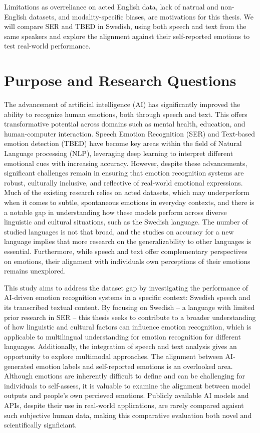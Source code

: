 Limitations as overreliance on acted English data, lack of natrual and non-English datasets, and modality-specific biases, are motivations for this thesis. We will compare SER and TBED in Swedish, using both speech and text from the same speakers and explore the alignment against their self-reported emotions to test real-world performance. 

\newpage
\section{Purpose and Research Questions}

The advancement of artificial intelligence (AI) has significantly improved the ability to recognize human emotions, both through speech and text. This offers transformative potential across domains such as mental health, education, and human-computer interaction. Speech Emotion Recognition (SER) and Text-based emotion detection (TBED) have become key areas within the field of Natural Language processing (NLP), leveraging deep learning to interpret different emotional cues with increasing accuracy. However, despite these advancements, significant challenges remain in ensuring that emotion recognition systems are robust, culturally inclusive, and reflective of real-world emotional expressions. Much of the existing research relies on acted datasets, which may underperform when it comes to subtle, spontaneous emotions in everyday contexts, and there is a notable gap in understanding how these models perform across diverse linguistic and cultural situations, such as the Swedish language. The number of studied languages is not that broad, and the studies on accuracy for a new language implies that more research on the generalizability to other languages is essential. Furthermore, while speech and text offer complementary perspectives on emotions, their alignment with individuals own perceptions of their emotions remains unexplored. 

This study aims to address the dataset gap by investigating the performance of AI-driven emotion recognition systems in a specific context: Swedish speech and its transcribed textual content. By focusing on Swedish – a language with limited prior research in SER – this thesis seeks to contribute to a broader understanding of how linguistic and cultural factors can influence emotion recognition, which is applicable to multilingual understanding for emotion recognition for different languages. Additionally, the integration of speech and text analysis gives an opportunity to explore multimodal approaches. The alignment between AI-generated emotion labels and self-reported emotions is an overlooked area. 
Although emotions are inherently difficult to define and can be challenging for individuals to self-assess, it is valuable to examine the alignment between model outputs and people’s own percieved emotions. Publicly available AI models and APIs, despite their use in real-world applications, are rarely compared agaisnt such subjective human data, making this comparative evaluation both novel and scientifically signficiant. 

